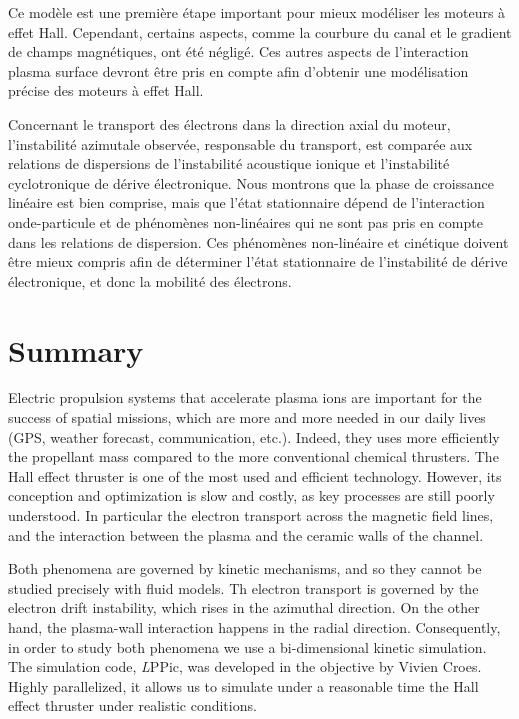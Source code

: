 Ce modèle est une première étape important pour mieux modéliser les moteurs à effet Hall.
Cependant, certains aspects, comme la courbure du canal et le gradient de champs magnétiques, ont été négligé.
Ces autres aspects de l'interaction plasma surface devront être pris en compte afin d'obtenir une modélisation précise des moteurs à effet Hall. 

Concernant le transport des électrons dans la direction axial du moteur, l'instabilité azimutale observée, responsable du transport, est comparée aux relations de dispersions de l'instabilité acoustique ionique et l'instabilité cyclotronique de dérive électronique. 
Nous montrons que la phase de croissance linéaire est bien comprise, mais que l'état stationnaire dépend de l'interaction onde-particule et de phénomènes non-linéaires qui ne sont pas pris en compte dans les relations de dispersion.
Ces phénomènes non-linéaire et cinétique doivent être mieux compris afin de déterminer l'état stationnaire de l'instabilité de dérive électronique, et donc la mobilité des électrons.

\chapter*{Summary}

Electric propulsion systems that accelerate plasma ions are important for the success of spatial missions, which are more and more needed in our daily lives (GPS, weather forecast, communication, etc.).
Indeed, they uses more efficiently the propellant mass compared to the more conventional chemical thrusters.
The Hall effect thruster is one of the most used and efficient technology.
However, its conception and optimization is slow and costly, as key processes are still poorly understood.
In particular the electron transport across the magnetic field lines, and the interaction between the plasma and the ceramic walls of the channel.

Both phenomena are governed by kinetic mechanisms, and so they cannot be studied precisely with fluid models.
Th electron transport is governed by the electron drift instability, which rises in the azimuthal direction.
On the other hand, the plasma-wall interaction happens in the radial direction.
Consequently, in order to study both phenomena we use a bi-dimensional kinetic simulation. 
The simulation code, {\emph LPPic}, was developed in the objective by Vivien Croes.
Highly parallelized, it allows us to simulate under a reasonable time the Hall effect thruster under realistic conditions.

